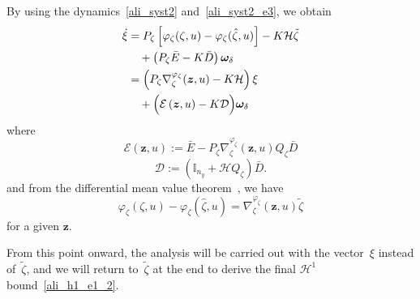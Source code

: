 By using the dynamics~\eqref{ali_syst2} and~\eqref{ali_syst2_e3}, we obtain
\begin{align}\label{ali_syst2_e6}
\dot{\xi} &= P_{\zeta} \left[ \varphi_{\zeta}(\zeta,u) - \varphi_{\zeta}(\hat{\zeta},u) \right] -K \mathcal{H} \tilde{\zeta} \notag \\
&\quad + \left(P_{\zeta} \bar{E} - K \bar{D} \right) \bm{\omega}_{\delta} \notag \\
&= \left(P_{\zeta} \nabla^{\varphi_{\zeta}}_{\zeta}(\bm{z},u) - K  \mathcal{H} \right) \xi \notag \\
&\quad+ \Big( \mathcal{E}\left( \bm{z},u\right) - K  \mathcal{D} \Big) \bm{\omega}_{\delta}
\end{align}
where
$$
\mathcal{E}\left( \bm{z},u\right) := \bar{E} - P_{\zeta} \nabla^{\varphi_{\zeta}}_{\zeta}(\bm{z},u) Q_{\zeta} \bar{D}
$$
$$
\mathcal{D} := \left( \mathbb{I}_{n_y} + \mathcal{H} Q_{\zeta} \right) \bar{D}.
$$
and from the differential mean value theorem~\cite{Hasni_LCSS_24}, we have
$$
\varphi_{\zeta}\left(\zeta,u \right) - \varphi_{\zeta}\left(\hat{\zeta},u \right) = \nabla^{\varphi_{\zeta}}_{\zeta}(\bm{z},u) \tilde{\zeta}
$$
for a given $\bm{z}$.

From this point onward, the analysis will be carried out with the vector~$\xi$ instead of~$\tilde{\zeta}$, and we will return to~$\tilde{\zeta}$ at the end to derive the final $\mathcal{H}^{1}$ bound~\eqref{ali_h1_e1_2}.
